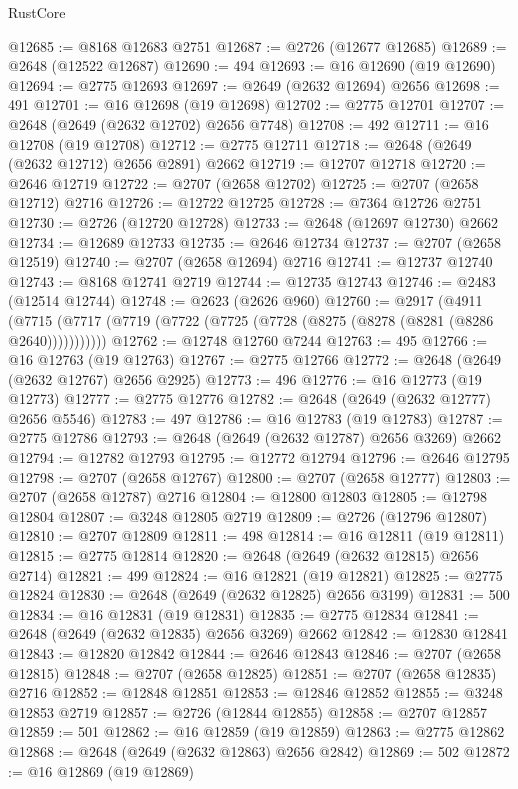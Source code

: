 \begin{lexlean}{RustCore}
\begin{coremodule}
@12685 := @8168 @12683 @2751
@12687 := @2726 (@12677 @12685)
@12689 := @2648 (@12522 @12687)
@12690 := 494
@12693 := @16 @12690 (@19 @12690)
@12694 := @2775 @12693
@12697 := @2649 (@2632 @12694) @2656
@12698 := 491
@12701 := @16 @12698 (@19 @12698)
@12702 := @2775 @12701
@12707 := @2648 (@2649 (@2632 @12702) @2656 @7748)
@12708 := 492
@12711 := @16 @12708 (@19 @12708)
@12712 := @2775 @12711
@12718 := @2648 (@2649 (@2632 @12712) @2656 @2891) @2662
@12719 := @12707 @12718
@12720 := @2646 @12719
@12722 := @2707 (@2658 @12702)
@12725 := @2707 (@2658 @12712) @2716
@12726 := @12722 @12725
@12728 := @7364 @12726 @2751
@12730 := @2726 (@12720 @12728)
@12733 := @2648 (@12697 @12730) @2662
@12734 := @12689 @12733
@12735 := @2646 @12734
@12737 := @2707 (@2658 @12519)
@12740 := @2707 (@2658 @12694) @2716
@12741 := @12737 @12740
@12743 := @8168 @12741 @2719
@12744 := @12735 @12743
@12746 := @2483 (@12514 @12744)
@12748 := @2623 (@2626 @960)
@12760 := @2917
    (@4911 (@7715 (@7717 (@7719 (@7722 (@7725 (@7728 (@8275 (@8278 (@8281 (@8286 @2640)))))))))))
@12762 := @12748 @12760 @7244
@12763 := 495
@12766 := @16 @12763 (@19 @12763)
@12767 := @2775 @12766
@12772 := @2648 (@2649 (@2632 @12767) @2656 @2925)
@12773 := 496
@12776 := @16 @12773 (@19 @12773)
@12777 := @2775 @12776
@12782 := @2648 (@2649 (@2632 @12777) @2656 @5546)
@12783 := 497
@12786 := @16 @12783 (@19 @12783)
@12787 := @2775 @12786
@12793 := @2648 (@2649 (@2632 @12787) @2656 @3269) @2662
@12794 := @12782 @12793
@12795 := @12772 @12794
@12796 := @2646 @12795
@12798 := @2707 (@2658 @12767)
@12800 := @2707 (@2658 @12777)
@12803 := @2707 (@2658 @12787) @2716
@12804 := @12800 @12803
@12805 := @12798 @12804
@12807 := @3248 @12805 @2719
@12809 := @2726 (@12796 @12807)
@12810 := @2707 @12809
@12811 := 498
@12814 := @16 @12811 (@19 @12811)
@12815 := @2775 @12814
@12820 := @2648 (@2649 (@2632 @12815) @2656 @2714)
@12821 := 499
@12824 := @16 @12821 (@19 @12821)
@12825 := @2775 @12824
@12830 := @2648 (@2649 (@2632 @12825) @2656 @3199)
@12831 := 500
@12834 := @16 @12831 (@19 @12831)
@12835 := @2775 @12834
@12841 := @2648 (@2649 (@2632 @12835) @2656 @3269) @2662
@12842 := @12830 @12841
@12843 := @12820 @12842
@12844 := @2646 @12843
@12846 := @2707 (@2658 @12815)
@12848 := @2707 (@2658 @12825)
@12851 := @2707 (@2658 @12835) @2716
@12852 := @12848 @12851
@12853 := @12846 @12852
@12855 := @3248 @12853 @2719
@12857 := @2726 (@12844 @12855)
@12858 := @2707 @12857
@12859 := 501
@12862 := @16 @12859 (@19 @12859)
@12863 := @2775 @12862
@12868 := @2648 (@2649 (@2632 @12863) @2656 @2842)
@12869 := 502
@12872 := @16 @12869 (@19 @12869)

\end{coremodule}
\end{lexlean}
